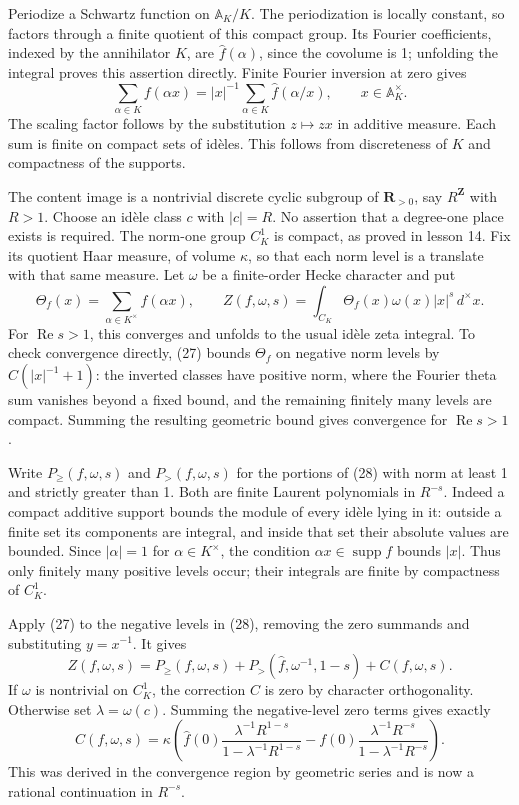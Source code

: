 \documentclass[11pt,a4paper]{article}
\begin{document}
Periodize a Schwartz function on \(\mathbb A_K/K\). The periodization is
locally constant, so factors through a finite quotient of this compact
group. Its Fourier coefficients, indexed by the annihilator \(K\), are
\(\widehat f(\alpha)\), since the covolume is 1; unfolding the integral
proves this assertion directly. Finite Fourier inversion at zero gives
\[
\sum_{\alpha\in K}f(\alpha x)
=|x|^{-1}\sum_{\alpha\in K}\widehat f(\alpha/x),\qquad x\in\mathbb A_K^\times.
\tag{27}
\] The scaling factor follows by the substitution \(z\mapsto zx\) in
additive measure. Each sum is finite on compact sets of idèles. This
follows from discreteness of \(K\) and compactness of the supports.

The content image is a nontrivial discrete cyclic subgroup of
\(\mathbf R_{>0}\), say \(R^{\mathbf Z}\) with \(R>1\). Choose an idèle
class \(c\) with \(|c|=R\). No assertion that a degree-one place exists
is required. The norm-one group \(C_K^1\) is compact, as proved in
lesson 14. Fix its quotient Haar measure, of volume \(\kappa\), so that
each norm level is a translate with that same measure. Let \(\omega\) be
a finite-order Hecke character and put \[
\Theta_f(x)=\sum_{\alpha\in K^\times}f(\alpha x),\qquad
Z(f,\omega,s)=\int_{C_K}\Theta_f(x)\omega(x)|x|^s\,d^\times x.
\tag{28}
\] For \(\operatorname{Re}s>1\), this converges and unfolds to the usual
idèle zeta integral. To check convergence directly, (27) bounds
\(\Theta_f\) on negative norm levels by \(C(|x|^{-1}+1)\): the inverted
classes have positive norm, where the Fourier theta sum vanishes beyond
a fixed bound, and the remaining finitely many levels are compact.
Summing the resulting geometric bound gives convergence for
\(\operatorname{Re}s>1\).

Write \(P_{\geq}(f,\omega,s)\) and \(P_>(f,\omega,s)\) for the portions
of (28) with norm at least 1 and strictly greater than 1. Both are
finite Laurent polynomials in \(R^{-s}\). Indeed a compact additive
support bounds the module of every idèle lying in it: outside a finite
set its components are integral, and inside that set their absolute
values are bounded. Since \(|\alpha|=1\) for \(\alpha\in K^\times\), the
condition \(\alpha x\in\operatorname{supp}f\) bounds \(|x|\). Thus only
finitely many positive levels occur; their integrals are finite by
compactness of \(C_K^1\).

Apply (27) to the negative levels in (28), removing the zero summands
and substituting \(y=x^{-1}\). It gives \[
Z(f,\omega,s)=P_{\geq}(f,\omega,s)
 +P_>(\widehat f,\omega^{-1},1-s)+C(f,\omega,s).
\tag{29}
\] If \(\omega\) is nontrivial on \(C_K^1\), the correction \(C\) is
zero by character orthogonality. Otherwise set \(\lambda=\omega(c)\).
Summing the negative-level zero terms gives exactly \[
C(f,\omega,s)=\kappa\left(
\widehat f(0)\frac{\lambda^{-1}R^{1-s}}{1-\lambda^{-1}R^{1-s}}
-f(0)\frac{\lambda^{-1}R^{-s}}{1-\lambda^{-1}R^{-s}}
\right).
\tag{30}
\] This was derived in the convergence region by geometric series and is
now a rational continuation in \(R^{-s}\).
\end{document}
